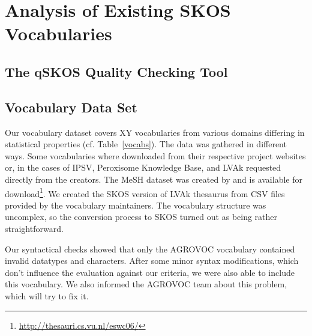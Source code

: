 
\section{Analysis of Existing SKOS Vocabularies}\label{sec:analysis}

\subsection{The qSKOS Quality Checking Tool}


\subsection{Vocabulary Data Set}
Our vocabulary dataset covers XY vocabularies from various domains differing in statistical properties (cf. Table~\ref{vocabs}). The data was gathered in different ways. Some vocabularies where downloaded from their respective project websites or, in the cases of IPSV, Peroxisome Knowledge Base, and LVAk requested directly from the creators. The MeSH dataset was created by \cite{Assem2006} and is available for download\footnote{\url{http://thesauri.cs.vu.nl/eswc06/}}. We created the SKOS version of LVAk thesaurus from CSV files provided by the vocabulary maintainers. The vocabulary structure was uncomplex, so the conversion process to SKOS turned out as being rather straightforward.
 
Our syntactical checks showed that only the AGROVOC vocabulary contained invalid datatypes and characters. After some minor syntax modifications, which don’t influence the evaluation against our criteria, we were also able to include this vocabulary. We also informed the AGROVOC team about this problem, which will try to fix it.



